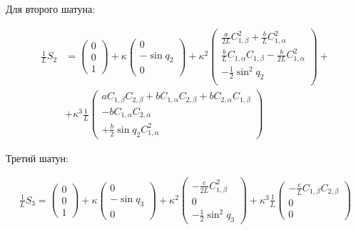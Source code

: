 Для второго шатуна:

\begin{equation}
\begin{aligned}
\frac{1}{L}S_2 &= \begin{pmatrix}0 \\ 0 \\ 1\end{pmatrix} + \kappa\begin{pmatrix}0 \\ -\sin{q_2}\\ 0\end{pmatrix} + \kappa^2\begin{pmatrix}\frac{a}{2L}C^2_{1,\beta} + \frac{b}{L}C_{1,\alpha}^2\\\frac{b}{L}C_{1,\alpha}C_{1,\beta} -\frac{b}{2L}C_{1,\alpha}^2\\ -\frac{1}{2}\sin^2{q_2} \\ \end{pmatrix} + \\
& + \kappa^3\frac{1}{L}\begin{pmatrix}aC_{1,\beta}C_{2,\beta} + bC_{1,\alpha}C_{2,\beta} + bC_{2,\alpha}C_{1,\beta} \\ -bC_{1,\alpha}C_{2,\alpha} \\ +\frac{b}{2}\sin{q_2}C_{1,\alpha}^2\end{pmatrix}
\end{aligned}
\end{equation}

Третий шатун:

\begin{equation}
\begin{aligned}
	\frac{1}{L}S_3 = \begin{pmatrix}0 \\ 0 \\ 1\end{pmatrix} + \kappa\begin{pmatrix}0 \\ -\sin{q_3}\\ 0\end{pmatrix} + \kappa^2\begin{pmatrix}-\frac{c}{2L}C^2_{1,\beta}\\0\\-\frac{1}{2}\sin^2{q_3}\end{pmatrix} + \kappa^3\frac{1}{L}\begin{pmatrix}-\frac{c}{L}C_{1,\beta}C_{2,\beta}\\0\\0\end{pmatrix}
\end{aligned}
\end{equation}

